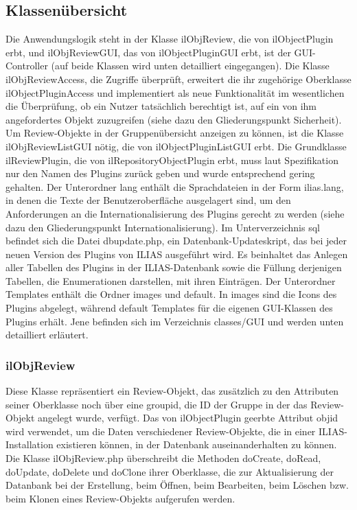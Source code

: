 \documentclass[a4paper]{scrreprt}
\begin{document}
\subsection{Klassenübersicht}

Die Anwendungslogik steht in der Klasse ilObjReview, die von ilObjectPlugin erbt, und ilObjReviewGUI, das von ilObjectPluginGUI erbt, ist der GUI-Controller (auf beide Klassen wird unten detailliert eingegangen). 
Die Klasse ilObjReviewAccess, die Zugriffe überprüft, erweitert die ihr zugehörige Oberklasse ilObjectPluginAccess und implementiert als neue Funktionalität im wesentlichen die Überprüfung, ob ein Nutzer tatsächlich berechtigt ist, auf ein von ihm angefordertes Objekt zuzugreifen (siehe dazu den Gliederungspunkt Sicherheit). 
Um Review-Objekte in der Gruppenübersicht anzeigen zu können, ist die Klasse ilObjReviewListGUI nötig, die von ilObjectPluginListGUI erbt. 
Die Grundklasse ilReviewPlugin, die von ilRepositoryObjectPlugin erbt, muss laut Spezifikation nur den Namen des Plugins zurück geben und wurde entsprechend gering gehalten.
Der Unterordner lang enthält die Sprachdateien in der Form ilias\textunderscore[Sprachkürzel].lang, in denen die Texte der Benutzeroberfläche ausgelagert sind, um den Anforderungen an die Internationalisierung des Plugins gerecht zu werden (siehe dazu den Gliederungspunkt Internationalisierung).
Im Unterverzeichnis sql befindet sich die Datei dbupdate.php, ein Datenbank-Updateskript, das bei jeder neuen Version des Plugins von ILIAS ausgeführt wird. Es beinhaltet das Anlegen aller Tabellen des Plugins in der ILIAS-Datenbank sowie die Füllung derjenigen Tabellen, die Enumerationen darstellen, mit ihren Einträgen.
Der Unterordner Templates enthält die Ordner images und default. 
In images sind die Icons des Plugins abgelegt, während default Templates für die eigenen GUI-Klassen des Plugins erhält. 
Jene befinden sich im Verzeichnis classes/GUI und werden unten detailliert erläutert.\\

\subsubsection{ilObjReview}

Diese Klasse repräsentiert ein Review-Objekt, das zusätzlich zu den Attributen seiner Oberklasse noch über eine group\textunderscore id, die ID der Gruppe in der das Review-Objekt angelegt wurde, verfügt. 
Das von ilObjectPlugin geerbte Attribut obj\textunderscore id wird verwendet, um die Daten verschiedener Review-Objekte, die in einer ILIAS-Installation existieren können, in der Datenbank auseinanderhalten zu können.
Die Klasse ilObjReview.php überschreibt die Methoden doCreate, doRead, doUpdate, doDelete und doClone ihrer Oberklasse, die zur Aktualisierung der Datanbank bei der Erstellung, beim Öffnen, beim Bearbeiten, beim Löschen bzw. beim Klonen eines Review-Objekts aufgerufen werden. \\
\end{document}

